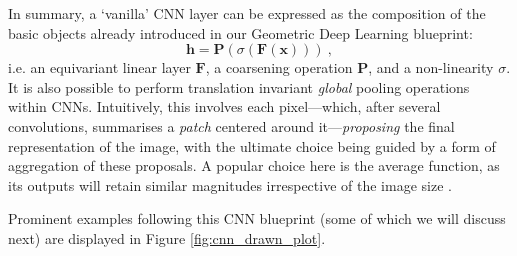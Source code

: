 In summary, a `vanilla' CNN layer can be expressed as the composition of the basic objects already introduced in our Geometric Deep Learning blueprint:
\begin{equation}
    \mathbf{h} = \mathbf{P}(\sigma(\mathbf{F}( \mathbf{x})))~,
\end{equation}
i.e. an equivariant linear layer $\mathbf{F}$, a coarsening operation $\mathbf{P}$, and a non-linearity $\sigma$. It is also possible to perform translation invariant \emph{global} pooling operations within CNNs. Intuitively, this involves each pixel---which, after several convolutions, summarises a \emph{patch} centered around it---\emph{proposing} the final representation of the image, with the ultimate choice being guided by a form of aggregation of these proposals. A popular choice here is the average function, as its outputs will retain similar magnitudes irrespective of the image size \citep{springenberg2014striving}.

Prominent examples following this CNN blueprint (some of which we will discuss next) are displayed in Figure \ref{fig:cnn_drawn_plot}.

